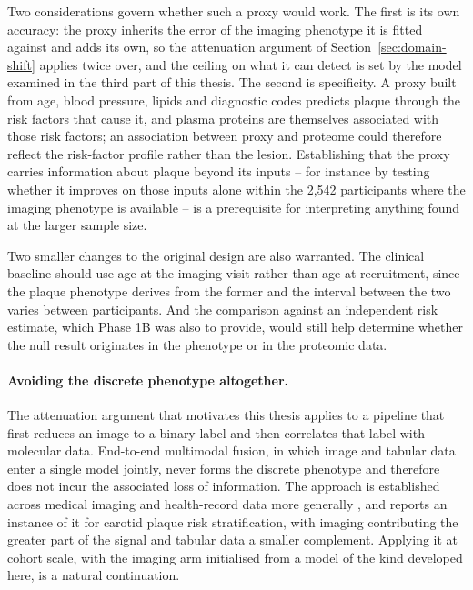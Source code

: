 Two considerations govern whether such a proxy would work. The first is its own accuracy: the
proxy inherits the error of the imaging phenotype it is fitted against and adds its own, so the
attenuation argument of Section~\ref{sec:domain-shift} applies twice over, and the ceiling on
what it can detect is set by the model examined in the third part of this thesis. The second is
specificity. A proxy built from age, blood pressure, lipids and diagnostic codes predicts plaque
through the risk factors that cause it, and plasma proteins are themselves associated with those
risk factors; an association between proxy and proteome could therefore reflect the risk-factor
profile rather than the lesion. Establishing that the proxy carries information about plaque
beyond its inputs -- for instance by testing whether it improves on those inputs alone within the
2{,}542 participants where the imaging phenotype is available -- is a prerequisite for
interpreting anything found at the larger sample size.

Two smaller changes to the original design are also warranted. The clinical baseline should use
age at the imaging visit rather than age at recruitment, since the plaque phenotype derives from
the former and the interval between the two varies between participants. And the comparison
against an independent risk estimate, which Phase 1B was also to provide, would still help
determine whether the null result originates in the phenotype or in the proteomic data.

\paragraph{Avoiding the discrete phenotype altogether.}
The attenuation argument that motivates this thesis applies to a pipeline that first reduces an
image to a binary label and then correlates that label with molecular data. End-to-end multimodal
fusion, in which image and tabular data enter a single model jointly, never forms the discrete
phenotype and therefore does not incur the associated loss of information. The approach is
established across medical imaging and health-record data more generally
\cite{huang2020fusion}, and \textcite{stamos2025} reports an instance of it for carotid
plaque risk stratification, with imaging contributing the greater part of the signal and tabular
data a smaller complement. Applying it at cohort scale, with the imaging arm initialised from a
model of the kind developed here, is a natural continuation.

